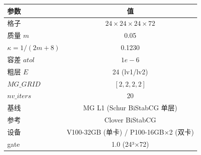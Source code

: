 \begin{tabular}{l c}
\hline
参数 & 值 \\
\hline
格子 & $24\times24\times24\times72$ \\
质量 $m$ & 0.05 \\
$\kappa=1/(2m+8)$ & 0.1230 \\
容差 $atol$ & $1e-6$ \\
粗层 $E$ & 24 (lv1/lv2) \\
$MG\_GRID$ & $[2,2,2,2]$ \\
$nv\_iters$ & 20 \\
基线 & MG L1 (Schur BiStabCG 单层) \\
参考 & Clover BiStabCG \\
设备 & V100-32GB (单卡) / P100-16GB×2 (双卡) \\
gate & 1.0 (24³×72) \\
\hline
\end{tabular}
